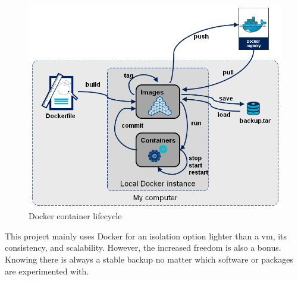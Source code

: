 \begin{figure}[!h]
  \centering
  \includegraphics[width=\linewidth]{images/docker_container_lifecycle.png}
  \caption{Docker container lifecycle \cite{octo_talks}}
\end{figure}

This project mainly uses Docker for an isolation option lighter than a \acs{vm}, its consistency, and scalability. However, the increased freedom is also a bonus. Knowing there is always a stable backup no matter which software or packages are experimented with.